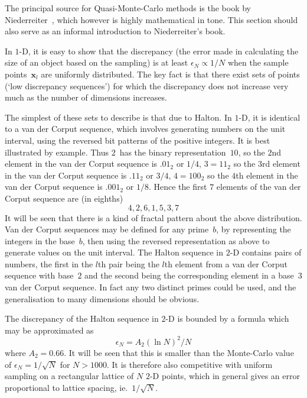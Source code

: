 The principal source for Quasi-Monte-Carlo methods is the book by
Niederreiter~\cite{niederreiter}, which however is highly mathematical
in tone. This section should also serve as an informal introduction
to Niederreiter's book.

In $1$-D, it is easy to show that the discrepancy (the error made in calculating
the size of an object based on the sampling)
is at least $\epsilon_N \propto 1/N$  when the sample points~${\mathbf x}_l$ are uniformly distributed. 
The key fact is that there exist sets of points (`low discrepancy sequences')
for which
the  discrepancy does not increase very much as the number of dimensions increases.

The simplest of these sets to describe is that due to Halton. In $1$-D, it is
identical to a van der Corput sequence, which involves generating
numbers on the unit interval, using the reversed bit patterns of the positive integers.
It is best illustrated by example. Thus $2$~has the binary representation~$10$, so
the $2$nd element in the van der Corput sequence is $.01_2$ or $1/4$, $3=11_2$ so
the $3$rd element in the van der Corput sequence is $.11_2$ or $3/4$, $4=100_2$ so
the $4$th element in the van der Corput sequence is $.001_2$ or $1/8$. Hence the
first $7$ elements of the van der Corput sequence are (in eighths)
\begin{equation}
4,2,6,1,5,3,7
\end{equation}
It will be seen that there is a kind of fractal pattern about the above distribution.
Van der Corput  sequences may be defined for any prime~$b$, by representing the integers
in the base~$b$, then using the reversed representation as above to generate
values on the unit interval. The Halton sequence in $2$-D contains pairs
of numbers, the first in the $l$th pair being the $l$th element from a van der Corput sequence with base~$2$
and  the second being the corresponding element in a base~$3$ van der Corput sequence.
In fact any two distinct primes could be used, and the generalisation to
many dimensions should be obvious.

The discrepancy of the Halton sequence in $2$-D is bounded by
a formula which may be approximated as
\begin{equation}
\epsilon_N = A_2 (\ln N)^2/N
\end{equation} 
where $A_2=0.66$. It will be seen that this is smaller than
the Monte-Carlo value of $\epsilon_N = 1/\sqrt{N}$ for $N > 1000$. It
is therefore also competitive with uniform sampling on a rectangular lattice of $N$
$2$-D points,
which in general gives an error proportional to
lattice spacing, ie.~$1/\sqrt{N}$.

